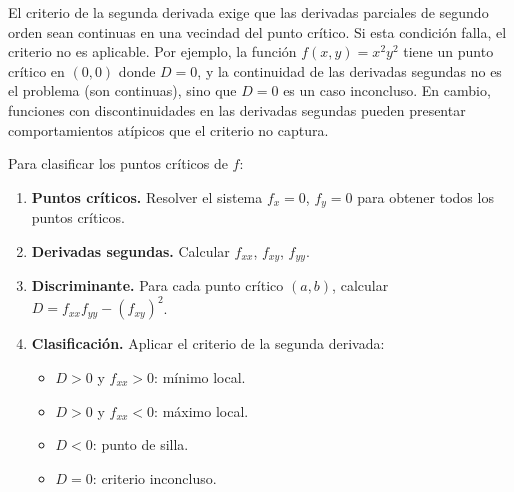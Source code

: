 \begin{rem}
El criterio de la segunda derivada exige que las derivadas parciales de
segundo orden sean continuas en una vecindad del punto crítico. Si esta
condición falla, el criterio no es aplicable. Por ejemplo, la función
$f(x,y) = x^2 y^2$ tiene un punto crítico en $(0,0)$ donde $D=0$, y la
continuidad de las derivadas segundas no es el problema (son continuas),
sino que $D=0$ es un caso inconcluso. En cambio, funciones con
discontinuidades en las derivadas segundas pueden presentar
comportamientos atípicos que el criterio no captura.
\end{rem}

\begin{pasos}
Para clasificar los puntos críticos de $f$:
\begin{enumerate}
    \item \textbf{Puntos críticos.} Resolver el sistema
    $f_x=0$, $f_y=0$ para obtener todos los puntos críticos.
    \item \textbf{Derivadas segundas.} Calcular $f_{xx}$, $f_{xy}$,
    $f_{yy}$.
    \item \textbf{Discriminante.} Para cada punto crítico $(a,b)$,
    calcular $D = f_{xx} f_{yy} - (f_{xy})^2$.
    \item \textbf{Clasificación.} Aplicar el criterio de la segunda
    derivada:
    \begin{itemize}
        \item $D>0$ y $f_{xx}>0$: mínimo local.
        \item $D>0$ y $f_{xx}<0$: máximo local.
        \item $D<0$: punto de silla.
        \item $D=0$: criterio inconcluso.
    \end{itemize}
\end{enumerate}
\end{pasos}

